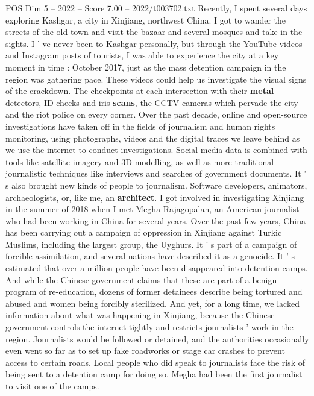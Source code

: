 \begin{textsample}{POS Dim 5 – 2022 – Score 7.00 – 2022/t003702.txt}  \label{ex:f5_pos_047}
Recently, I spent several days exploring Kashgar, a city in Xinjiang, northwest China.
I got to wander the streets of the old town and visit the bazaar and several mosques and take in the sights.
I ' ve never been to Kashgar personally, but through the YouTube videos and Instagram posts of tourists, I was able to experience the city at a key moment in time : October 2017, just as the mass detention campaign in the region was gathering pace.
These videos could help us investigate the visual signs of the crackdown.
The checkpoints at each intersection with their \textbf{metal} detectors, ID checks and iris \textbf{scans}, the CCTV cameras which pervade the city and the riot police on every corner.
Over the past decade, online and open-source investigations have taken off in the fields of journalism and human rights monitoring, using photographs, videos and the digital traces we leave behind as we use the internet to conduct investigations.
Social media data is combined with tools like satellite imagery and 3D modelling, as well as more traditional journalistic techniques like interviews and searches of government documents.
It ' s also brought new kinds of people to journalism.
Software developers, animators, archaeologists, or, like me, an \textbf{architect}.
I got involved in investigating Xinjiang in the summer of 2018 when I met Megha Rajagopalan, an American journalist who had been working in China for several years.
Over the past few years, China has been carrying out a campaign of oppression in Xinjiang against Turkic Muslims, including the largest group, the Uyghurs.
It ' s part of a campaign of forcible assimilation, and several nations have described it as a genocide.
It ' s estimated that over a million people have been disappeared into detention camps.
And while the Chinese government claims that these are part of a benign program of re-education, dozens of former detainees describe being tortured and abused and women being forcibly sterilized.
And yet, for a long time, we lacked information about what was happening in Xinjiang, because the Chinese government controls the internet tightly and restricts journalists ' work in the region.
Journalists would be followed or detained, and the authorities occasionally even went so far as to set up fake roadworks or stage car crashes to prevent access to certain roads.
Local people who did speak to journalists face the risk of being sent to a detention camp for doing so.
Megha had been the first journalist to visit one of the camps.

\end{textsample}
